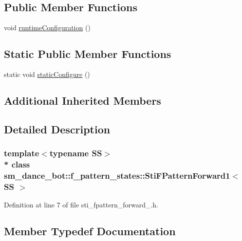 \subsection*{Public Member Functions}
\begin{DoxyCompactItemize}
\item 
void \hyperlink{structsm__dance__bot_1_1f__pattern__states_1_1StiFPatternForward1_ac11cfe45411e4feacb4e20356e2fea51}{runtime\+Configuration} ()
\end{DoxyCompactItemize}
\subsection*{Static Public Member Functions}
\begin{DoxyCompactItemize}
\item 
static void \hyperlink{structsm__dance__bot_1_1f__pattern__states_1_1StiFPatternForward1_a2a72e67d72c63c164fb976986570706b}{static\+Configure} ()
\end{DoxyCompactItemize}
\subsection*{Additional Inherited Members}


\subsection{Detailed Description}
\subsubsection*{template$<$typename SS$>$\\*
class sm\+\_\+dance\+\_\+bot\+::f\+\_\+pattern\+\_\+states\+::\+Sti\+F\+Pattern\+Forward1$<$ S\+S $>$}



Definition at line 7 of file sti\+\_\+fpattern\+\_\+forward\+\_.\+h.



\subsection{Member Typedef Documentation}
